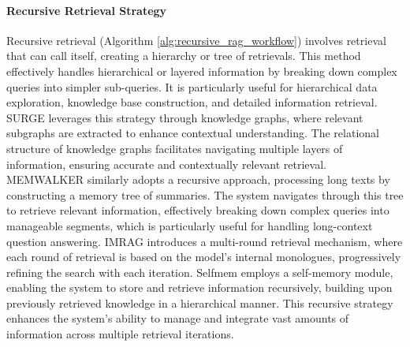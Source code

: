 \paragraph{Recursive Retrieval Strategy} Recursive retrieval (Algorithm \ref{alg:recursive_rag_workflow}) involves retrieval that can call itself, creating a hierarchy or tree of retrievals. This method effectively handles hierarchical or layered information by breaking down complex queries into simpler sub-queries. It is particularly useful for hierarchical data exploration, knowledge base construction, and detailed information retrieval. SURGE \cite{kang2023knowledge} leverages this strategy through knowledge graphs, where relevant subgraphs are extracted to enhance contextual understanding. The relational structure of knowledge graphs facilitates navigating multiple layers of information, ensuring accurate and contextually relevant retrieval. MEMWALKER \cite{chen2023walking} similarly adopts a recursive approach, processing long texts by constructing a memory tree of summaries. The system navigates through this tree to retrieve relevant information, effectively breaking down complex queries into manageable segments, which is particularly useful for handling long-context question answering. IMRAG \cite{yang2024imrag} introduces a multi-round retrieval mechanism, where each round of retrieval is based on the model's internal monologues, progressively refining the search with each iteration. Selfmem \cite{cheng2023lift} employs a self-memory module, enabling the system to store and retrieve information recursively, building upon previously retrieved knowledge in a hierarchical manner. This recursive strategy enhances the system’s ability to manage and integrate vast amounts of information across multiple retrieval iterations.

